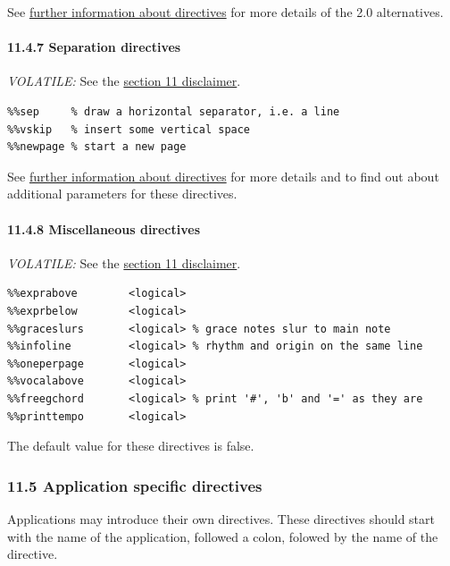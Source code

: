 \documentclass[oneside]{book}
\let\oldparagraph\paragraph
\renewcommand{\paragraph}[1]{\oldparagraph{#1}\mbox{}}
\begin{document}
See \protect\hyperlink{further_information_about_directives}{further
information about directives} for more details of the 2.0 alternatives.

\hypertarget{separation_directives}{\paragraph{11.4.7 Separation
directives}\label{separation_directives}}

\emph{VOLATILE:} See the \protect\hyperlink{disclaimer}{section 11
disclaimer}.

\begin{verbatim}
%%sep     % draw a horizontal separator, i.e. a line
%%vskip   % insert some vertical space
%%newpage % start a new page
\end{verbatim}

See \protect\hyperlink{further_information_about_directives}{further
information about directives} for more details and to find out about
additional parameters for these directives.

\hypertarget{miscellaneous_directives}{\paragraph{11.4.8 Miscellaneous
directives}\label{miscellaneous_directives}}

\emph{VOLATILE:} See the \protect\hyperlink{disclaimer}{section 11
disclaimer}.

\begin{verbatim}
%%exprabove        <logical>
%%exprbelow        <logical>
%%graceslurs       <logical> % grace notes slur to main note
%%infoline         <logical> % rhythm and origin on the same line
%%oneperpage       <logical>
%%vocalabove       <logical>
%%freegchord       <logical> % print '#', 'b' and '=' as they are
%%printtempo       <logical>
\end{verbatim}

The default value for these directives is false.

\hypertarget{application_specific_directives}{\subsubsection{11.5
Application specific directives}\label{application_specific_directives}}

Applications may introduce their own directives. These directives should
start with the name of the application, followed a colon, folowed by the
name of the directive.
\end{document}
